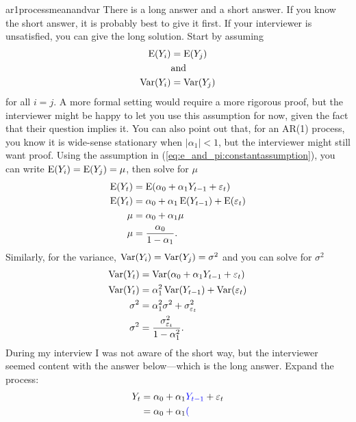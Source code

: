 \begin{answer}{ar1processmeanandvar}
There is a long answer and a short answer.
If you know the short answer, it is probably best to give it first.
If your interviewer is unsatisfied, you can give the long solution.
Start by assuming
\begin{equation}
\label{eq:e_and_pi:constantassumption}
\begin{aligned}
\operatorname{\mathrm{E}}(Y_i) &= \operatorname{\mathrm{E}}(Y_j) \\
    &\text{and}    \\
\operatorname{\mathrm{Var}}(Y_i) &= \operatorname{\mathrm{Var}}(Y_j)
\end{aligned}
\end{equation}
for all $i = j$.
A more formal setting would require a more rigorous proof, but the interviewer might be happy to let you use this assumption for now, given the fact that their question implies it.
You can also point out that, for an AR(1) process, you know it is wide-sense stationary when
$|\alpha_1| < 1$,
but the interviewer might still want proof.
Using the assumption in (\ref{eq:e_and_pi:constantassumption}), you can write
$\operatorname{\mathrm{E}}(Y_i) = \operatorname{\mathrm{E}}(Y_j) = \mu$, then solve for $\mu$
\begin{align*}
  \operatorname{\mathrm{E}}(Y_t) &= \operatorname{\mathrm{E}}(\alpha_0 + \alpha_1 Y_{t-1} + \varepsilon_{t}) \\
  \operatorname{\mathrm{E}}(Y_t) &= \alpha_0 + \alpha_1 \operatorname{\mathrm{E}}(Y_{t-1}) + \operatorname{\mathrm{E}}(\varepsilon_{t}) \\
   \mu    &= \alpha_0 + \alpha_1   \mu \\
   \mu    &= \frac{ \alpha_0}{1-\alpha_1}
   \text{.}
\end{align*}
Similarly, for the variance,
$\operatorname{\mathrm{Var}}(Y_i) = \operatorname{\mathrm{Var}}(Y_j) = \sigma^2$ and you can solve for $\sigma^2$
\begin{align*}
  \operatorname{\mathrm{Var}}(Y_t) &= \operatorname{\mathrm{Var}}(\alpha_0 + \alpha_1 Y_{t-1} + \varepsilon_{t}) \\
  \operatorname{\mathrm{Var}}(Y_t) &=  \alpha_1^2 \operatorname{\mathrm{Var}}(Y_{t-1}) + \operatorname{\mathrm{Var}}(\varepsilon_{t}) \\
  \sigma^2  &=  \alpha_1^2 \sigma^2 + \sigma^2_{\varepsilon_{t}} \\
  \sigma^2  &=  \frac{ \sigma^2_{\varepsilon_{t}}}{1- \alpha_1^2}
  \text{.}
\end{align*}
During my interview I was not aware of the short way, but the interviewer seemed content with the answer below---which is the long answer.
Expand the process:
\begin{align*}
  Y_t &=
  \alpha_0 + \alpha_1
  \textcolor{blue}{Y_{t-1}} + \varepsilon_{t} \\
      &=
  \alpha_0 + \alpha_1
  \textcolor{blue}{(
}
\end{align*}
\end{answer}
